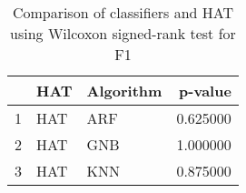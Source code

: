 \begin{table}
\footnotesize
\caption{Comparison of classifiers and HAT using Wilcoxon signed-rank test for F1}
\label{tab:HAT wilcoxon F1 comparison}
\begin{tabular}{lllr}
\hline
 & HAT & Algorithm & p-value \\
\hline
1 & HAT & ARF & 0.625000 \\
2 & HAT & GNB & 1.000000 \\
3 & HAT & KNN & 0.875000 \\
\hline
\end{tabular}
\end{table}
